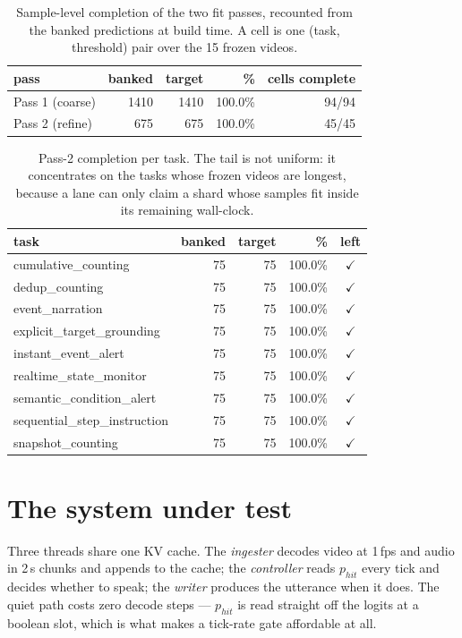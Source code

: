 \documentclass[11pt,a4paper]{article}
\begin{document}
\begin{table}[t]\centering\caption{Sample-level completion of the two fit passes, recounted from the banked predictions at build time. A cell is one (task, threshold) pair over the 15 frozen videos.}\label{tab:progress}
\begin{tabular}{lrrrr}\toprule
pass & banked & target & \% & cells complete \\\midrule
Pass 1 (coarse) & 1410 & 1410 & 100.0\% & 94/94 \\
Pass 2 (refine) & 675 & 675 & 100.0\% & 45/45 \\
\bottomrule\end{tabular}\end{table}


\begin{table}[t]\centering\caption{Pass-2 completion per task. The tail is not uniform: it concentrates on the tasks whose frozen videos are longest, because a lane can only claim a shard whose samples fit inside its remaining wall-clock.}\label{tab:p2tail}
\begin{tabular}{lrrrc}\toprule
task & banked & target & \% & left \\\midrule
cumulative\_counting & 75 & 75 & 100.0\% & $\checkmark$ \\
dedup\_counting & 75 & 75 & 100.0\% & $\checkmark$ \\
event\_narration & 75 & 75 & 100.0\% & $\checkmark$ \\
explicit\_target\_grounding & 75 & 75 & 100.0\% & $\checkmark$ \\
instant\_event\_alert & 75 & 75 & 100.0\% & $\checkmark$ \\
realtime\_state\_monitor & 75 & 75 & 100.0\% & $\checkmark$ \\
semantic\_condition\_alert & 75 & 75 & 100.0\% & $\checkmark$ \\
sequential\_step\_instruction & 75 & 75 & 100.0\% & $\checkmark$ \\
snapshot\_counting & 75 & 75 & 100.0\% & $\checkmark$ \\
\bottomrule\end{tabular}\end{table}


\section{The system under test}

Three threads share one KV cache. The \emph{ingester} decodes video at
1\,fps and audio in 2\,s chunks and appends to the cache; the \emph{controller}
reads $p_\mathit{hit}$ every tick and decides whether to speak; the \emph{writer}
produces the utterance when it does. The quiet path costs zero decode steps ---
$p_\mathit{hit}$ is read straight off the logits at a boolean slot, which is what
makes a tick-rate gate affordable at all.
\end{document}
